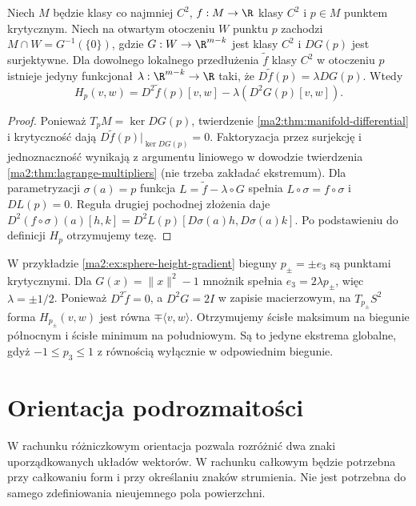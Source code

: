 \begin{wniosek}
\label{ma2:cor:manifold-hessian-lagrange}
Niech $M$ będzie klasy co najmniej $C^2$, $f:M\to\R$
klasy $C^2$ i $p\in M$ punktem krytycznym.
Niech na otwartym otoczeniu $W$ punktu $p$ zachodzi
$M\cap W=G^{-1}(\{0\})$, gdzie
$G:W\to\R^{m-k}$ jest klasy $C^2$ i $DG(p)$
jest surjektywne. Dla dowolnego lokalnego przedłużenia
$\widetilde f$ klasy $C^2$ w otoczeniu $p$
istnieje jedyny funkcjonał
$\lambda:\R^{m-k}\to\R$ taki, że
$D\widetilde f(p)=\lambda DG(p)$. Wtedy
\[
 H_p(v,w)=D^2\widetilde f(p)[v,w]
                 -\lambda(D^2G(p)[v,w]).
\]
\end{wniosek}
\begin{proof}
Ponieważ $T_pM=\ker DG(p)$, twierdzenie
\ref{ma2:thm:manifold-differential} i krytyczność dają
$D\widetilde f(p)|_{\ker DG(p)}=0$.
Faktoryzacja przez surjekcję i jednoznaczność wynikają
z argumentu liniowego w dowodzie twierdzenia
\ref{ma2:thm:lagrange-multipliers} (nie trzeba zakładać
ekstremum). Dla parametryzacji $\sigma(a)=p$ funkcja
$L=\widetilde f-\lambda\circ G$ spełnia
$L\circ\sigma=f\circ\sigma$ i $DL(p)=0$.
Reguła drugiej pochodnej złożenia daje
$D^2(f\circ\sigma)(a)[h,k]=D^2L(p)[D\sigma(a)h,D\sigma(a)k]$.
Po podstawieniu do definicji $H_p$ otrzymujemy tezę.
\end{proof}

W przykładzie \ref{ma2:ex:sphere-height-gradient} bieguny
$p_\pm=\pm e_3$ są punktami krytycznymi.
Dla $G(x)=\|x\|^2-1$ mnożnik spełnia
$e_3=2\lambda p_\pm$, więc $\lambda=\pm1/2$.
Ponieważ $D^2\widetilde f=0$, a $D^2G=2I$ w zapisie
macierzowym, na $T_{p_\pm}S^2$ forma $H_{p_\pm}(v,w)$
jest równa $\mp\langle v,w\rangle$. Otrzymujemy ścisłe
maksimum na biegunie północnym i ścisłe minimum na
południowym. Są to jedyne ekstrema globalne, gdyż
$-1\le p_3\le1$ z równością wyłącznie w odpowiednim
biegunie.

\section{Orientacja podrozmaitości}

W rachunku różniczkowym orientacja pozwala rozróżnić
dwa znaki uporządkowanych układów wektorów. W rachunku
całkowym będzie potrzebna przy całkowaniu form i przy
określaniu znaków strumienia. Nie jest potrzebna do
samego zdefiniowania nieujemnego pola powierzchni.

